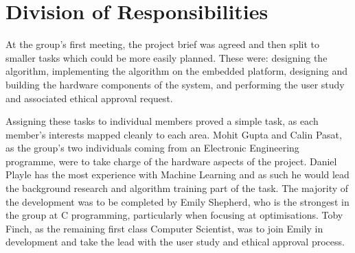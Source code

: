 \section{Division of Responsibilities}

At the group's first meeting, the project brief was agreed and then split to smaller tasks which could be more easily planned. These were: designing the algorithm, implementing the algorithm on the embedded platform, designing and building the hardware components of the system, and performing the user study and associated ethical approval request.

Assigning these tasks to individual members proved a simple task, as each member's interests mapped cleanly to each area. Mohit Gupta and Calin Pasat, as the group's two individuals coming from an Electronic Engineering programme, were to take charge of the hardware aspects of the project. Daniel Playle has the most experience with Machine Learning and as such he would lead the background research and algorithm training part of the task. The majority of the development was to be completed by Emily Shepherd, who is the strongest in the group at C programming, particularly when focusing at optimisations. Toby Finch, as the remaining first class Computer Scientist, was to join Emily in development and take the lead with the user study and ethical approval process.

